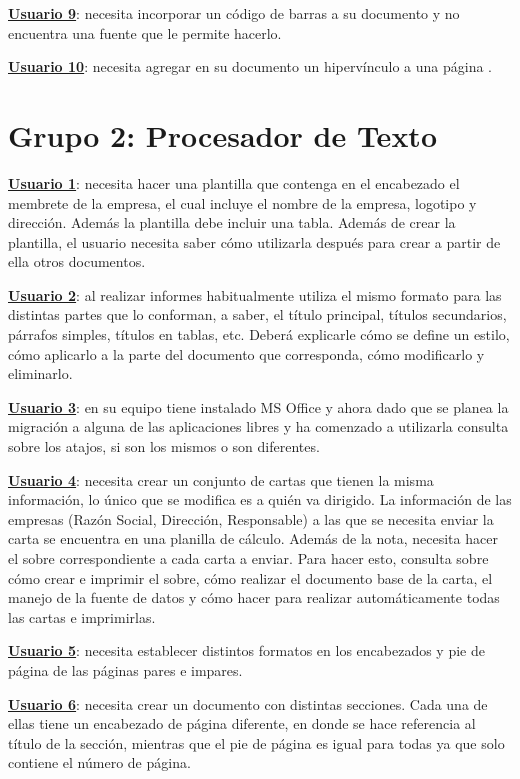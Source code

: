 \documentclass[12pt]{article}
\begin{document}
\textbf{\underline{Usuario 9}}: necesita incorporar un código de barras a su documento y no encuentra una fuente que le permite hacerlo.

\textbf{\underline{Usuario 10}}: necesita agregar en su documento un hipervínculo a una página .

\section*{\textbf{Grupo 2: Procesador de Texto}}

\textbf{\underline{Usuario 1}}: necesita hacer una plantilla que contenga en el encabezado el membrete de la empresa, el cual incluye el nombre de la empresa, logotipo y dirección. Además la plantilla debe incluir una tabla. 
Además de crear la plantilla, el usuario necesita saber cómo utilizarla después para crear a partir de ella otros documentos.

\textbf{\underline{Usuario 2}}: al realizar informes habitualmente utiliza el mismo formato para las distintas partes que lo conforman, a saber, el título principal, títulos secundarios, párrafos simples, títulos en tablas, etc. Deberá explicarle cómo se define un estilo, cómo aplicarlo a la parte del documento que corresponda, cómo modificarlo y eliminarlo.

\textbf{\underline{Usuario 3}}: en su equipo tiene instalado MS Office y ahora dado que se planea la migración a alguna de las aplicaciones libres y ha comenzado a utilizarla consulta sobre los atajos, si son los mismos o son diferentes.

\textbf{\underline{Usuario 4}}: necesita crear un conjunto de cartas que tienen la misma información, lo único que se modifica es a quién va dirigido. La información de las empresas (Razón Social, Dirección, Responsable) a las que se necesita enviar la carta se encuentra en una planilla de cálculo.
Además de la nota, necesita hacer el sobre correspondiente a cada carta a enviar. Para hacer esto, consulta sobre cómo crear e imprimir el sobre, cómo realizar el documento base de la carta, el manejo de la fuente de datos y cómo hacer para realizar automáticamente todas las cartas e imprimirlas.

\textbf{\underline{Usuario 5}}: necesita establecer distintos formatos en los encabezados y pie de página de las páginas pares e impares.

\textbf{\underline{Usuario 6}}: necesita crear un documento con distintas secciones. Cada una de ellas tiene un encabezado de página diferente, en donde se hace referencia al título de la sección, mientras que el pie de página es igual para todas ya que solo contiene el número de página. 
\end{document}
